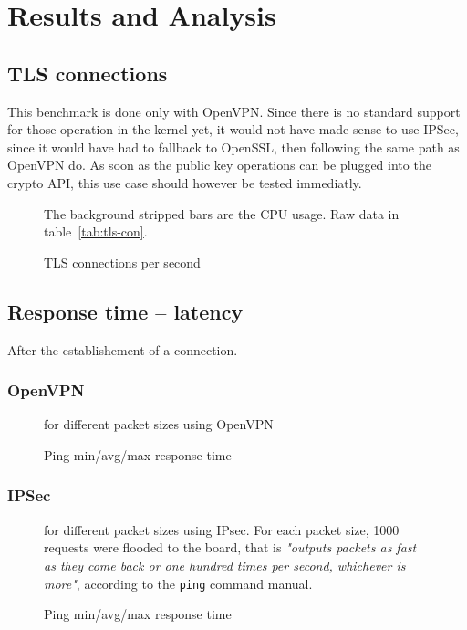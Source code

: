 \chapter{Results and Analysis}\label{chap:results}

\section{TLS connections}

This benchmark is done only with OpenVPN.
Since there is no standard support for those operation in the kernel yet, it would not have made sense to use IPSec, since it would have had to fallback to OpenSSL, then following the same path as OpenVPN do.
As soon as the public key operations can be plugged into the crypto API, this use case should however be tested immediatly.

\begin{figure}[ht]
\center

\caption{TLS connections per second}{The background stripped bars are the CPU usage. Raw data in table~\ref{tab:tls-con}.}
\label{fig:openvpn-tls-bench}
\end{figure}


\section{Response time -- latency}
After the establishement of a connection.

\subsection{OpenVPN}

\begin{figure}[ht]

\caption{Ping min/avg/max response time}{for different packet sizes using OpenVPN}
\label{fig:ping-benchmark-openvpn}
\end{figure}

\subsection{IPSec}

\begin{figure}[ht]

\caption{Ping min/avg/max response time}{for different packet sizes using IPsec. For each packet size, 1000 requests were flooded to the board, that is \textit{"outputs packets as fast as they come back or one hundred times per second, whichever is more"}, according to the \texttt{ping} command manual.} %
\label{fig:ping-benchmark-ipsec}
\end{figure}



